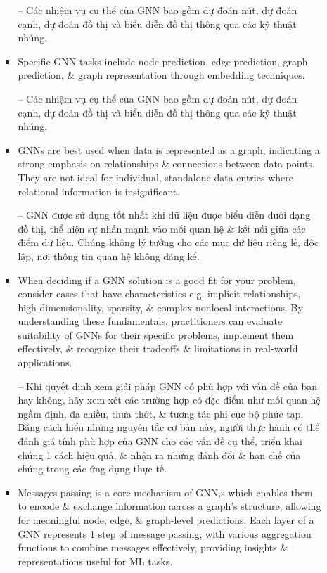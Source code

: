 \documentclass{article}
\begin{document}
\begin{itemize}
\begin{itemize}
\begin{itemize}
            -- Các nhiệm vụ cụ thể của GNN bao gồm dự đoán nút, dự đoán cạnh, dự đoán đồ thị và biểu diễn đồ thị thông qua các kỹ thuật nhúng.
            \item Specific GNN tasks include node prediction, edge prediction, graph prediction, \& graph representation through embedding techniques.

            -- Các nhiệm vụ cụ thể của GNN bao gồm dự đoán nút, dự đoán cạnh, dự đoán đồ thị và biểu diễn đồ thị thông qua các kỹ thuật nhúng.
            \item GNNs are best used when data is represented as a graph, indicating a strong emphasis on relationships \& connections between data points. They are not ideal for individual, standalone data entries where relational information is insignificant.

            -- GNN được sử dụng tốt nhất khi dữ liệu được biểu diễn dưới dạng đồ thị, thể hiện sự nhấn mạnh vào mối quan hệ \& kết nối giữa các điểm dữ liệu. Chúng không lý tưởng cho các mục dữ liệu riêng lẻ, độc lập, nơi thông tin quan hệ không đáng kể.
            \item When deciding if a GNN solution is a good fit for your problem, consider cases that have characteristics e.g. implicit relationships, high-dimensionality, sparsity, \& complex nonlocal interactions. By understanding these fundamentals, practitioners can evaluate suitability of GNNs for their specific problems, implement them effectively, \& recognize their tradeoffs \& limitations in real-world applications.

            -- Khi quyết định xem giải pháp GNN có phù hợp với vấn đề của bạn hay không, hãy xem xét các trường hợp có đặc điểm như mối quan hệ ngầm định, đa chiều, thưa thớt, \& tương tác phi cục bộ phức tạp. Bằng cách hiểu những nguyên tắc cơ bản này, người thực hành có thể đánh giá tính phù hợp của GNN cho các vấn đề cụ thể, triển khai chúng 1 cách hiệu quả, \& nhận ra những đánh đổi \& hạn chế của chúng trong các ứng dụng thực tế.
            \item Messages passing is a core mechanism of GNN,s which enables them to encode \& exchange information across a graph's structure, allowing for meaningful node, edge, \& graph-level predictions. Each layer of a GNN represents 1 step of message passing, with various aggregation functions to combine messages effectively, providing insights \& representations useful for ML tasks.


\end{itemize}
\end{itemize}
\end{itemize}
\end{document}
